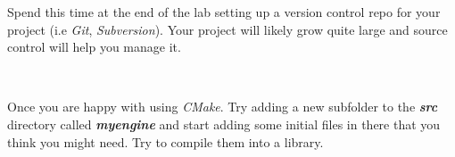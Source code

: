 \documentclass[10pt]{article}
\begin{document}
\begin{Note}
Spend this time at the end of the lab setting up a version control repo
for your project (i.e \textit{Git}, \textit{Subversion}). Your project
will likely grow quite large and source control will help you manage it.

\

Once you are happy with using \textit{CMake}. Try adding a new subfolder
to the \textbf{\textit{src}} directory called \textbf{\textit{myengine}}
and start adding some initial files in there that you think you might
need. Try to compile them into a library.  \end{Note}
\end{document}
